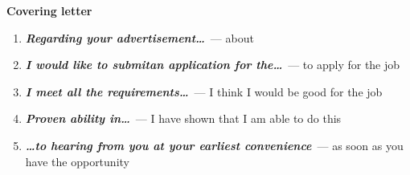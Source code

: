 \documentclass[10pt,a4paper]{article}
\begin{document}
\par\medskip\textbf{Covering letter}
\begin{enumerate}
  \item \textit{\textbf{Regarding your advertisement\dots}}~--- about
  \item \textit{\textbf{I would like to submitan application for the\dots}}~--- to apply for the job
  \item \textit{\textbf{I meet all the requirements\dots}}~--- I think I would be good for the job
  \item \textit{\textbf{Proven ability in\dots}}~--- I have shown that I am able to do this
  \item \textit{\textbf{\dots to hearing from you at your earliest convenience}}~--- as soon as you have the opportunity
\end{enumerate}
\end{document}
